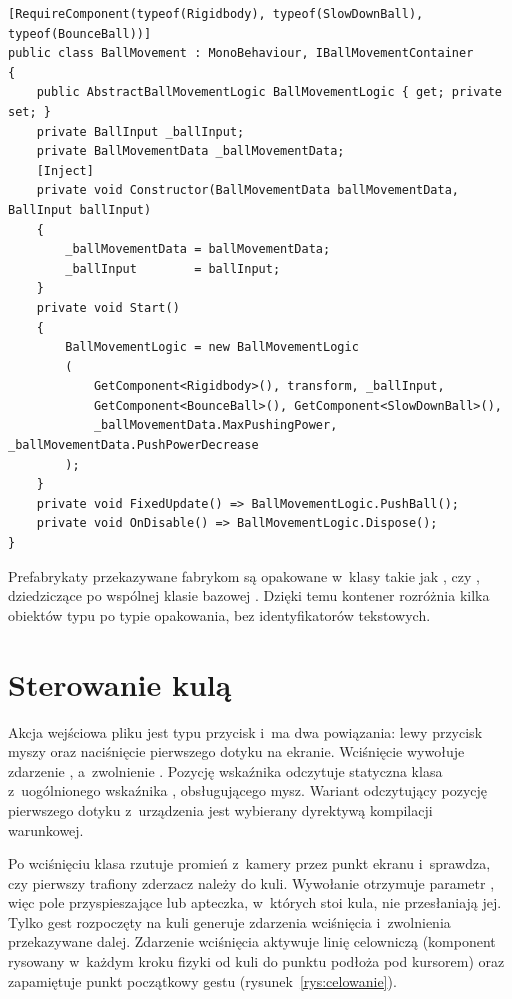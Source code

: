 \begin{lstlisting}[caption={Komponent BallMovement jako adapter pomiędzy silnikiem a~logiką ruchu; \zrodloWlasne},label=lst:ball-movement]
[RequireComponent(typeof(Rigidbody), typeof(SlowDownBall), typeof(BounceBall))]
public class BallMovement : MonoBehaviour, IBallMovementContainer
{
    public AbstractBallMovementLogic BallMovementLogic { get; private set; }
    private BallInput _ballInput;
    private BallMovementData _ballMovementData;
    [Inject]
    private void Constructor(BallMovementData ballMovementData, BallInput ballInput)
    {
        _ballMovementData = ballMovementData;
        _ballInput        = ballInput;
    }
    private void Start()
    {
        BallMovementLogic = new BallMovementLogic
        (
            GetComponent<Rigidbody>(), transform, _ballInput,
            GetComponent<BounceBall>(), GetComponent<SlowDownBall>(),
            _ballMovementData.MaxPushingPower, _ballMovementData.PushPowerDecrease
        );
    }
    private void FixedUpdate() => BallMovementLogic.PushBall();
    private void OnDisable() => BallMovementLogic.Dispose();
}
\end{lstlisting}

Prefabrykaty przekazywane fabrykom są opakowane w~klasy takie jak ,
 czy , dziedziczące po wspólnej klasie bazowej
. Dzięki temu kontener rozróżnia kilka obiektów typu
 po typie opakowania, bez identyfikatorów tekstowych.

\section{Sterowanie kulą}
\label{sec:sterowanie}

Akcja wejściowa  pliku  jest typu przycisk
i~ma dwa powiązania: lewy przycisk myszy oraz naciśnięcie pierwszego dotyku na ekranie.
Wciśnięcie wywołuje zdarzenie , a~zwolnienie . Pozycję
wskaźnika odczytuje statyczna klasa  z~uogólnionego wskaźnika
, obsługującego mysz. Wariant odczytujący pozycję pierwszego dotyku
z~urządzenia  jest wybierany dyrektywą kompilacji warunkowej.

Po wciśnięciu klasa  rzutuje promień z~kamery przez punkt ekranu
i~sprawdza, czy pierwszy trafiony zderzacz należy do kuli. Wywołanie 
otrzymuje parametr , więc pole przyspieszające lub
apteczka, w~których stoi kula, nie przesłaniają jej. Tylko gest rozpoczęty na kuli
generuje zdarzenia wciśnięcia i~zwolnienia przekazywane dalej. Zdarzenie wciśnięcia
aktywuje linię celowniczą (komponent  rysowany w~każdym kroku fizyki
od kuli do punktu podłoża pod kursorem) oraz zapamiętuje punkt początkowy gestu
(rysunek~\ref{rys:celowanie}).

